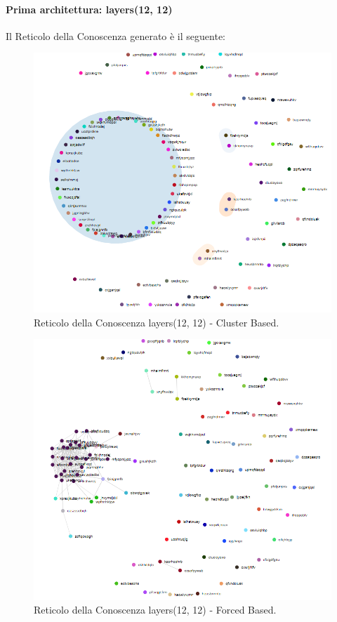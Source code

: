 \paragraph{Prima architettura: layers(12, 12)}\mbox{}
\label{Prima architettura}
\noindent
Il Reticolo della Conoscenza generato è il seguente:
\begin{figure}[H]
\centering
	\includegraphics[width=0.70\linewidth]{./image/logica(12,12).png}
	\caption{Reticolo della Conoscenza layers(12, 12) - Cluster Based.}
	\label{Reticolo della Conoscenza layers(12, 12) - Cluster Based.}
\end{figure}
\noindent

\begin{figure}[H]
\centering
	\includegraphics[width=0.70\linewidth]{./image/logica(12,12)_forced.png}
	\caption{Reticolo della Conoscenza layers(12, 12) - Forced Based.}
	\label{Reticolo della Conoscenza layers(12, 12) - Forced Based.}
\end{figure}
\noindent


